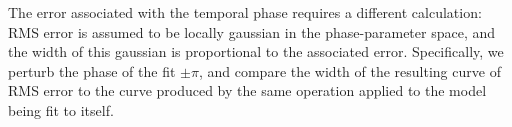 \hspace*{4ex}The error associated with the temporal phase requires a different calculation: RMS error is assumed to be locally gaussian in the phase-parameter space, and the width of this gaussian is proportional to the associated error. Specifically, we perturb the phase of the fit $\pm\pi$, and compare the width of the resulting curve of RMS error to the curve produced by the same operation applied to the model being fit to itself. %


